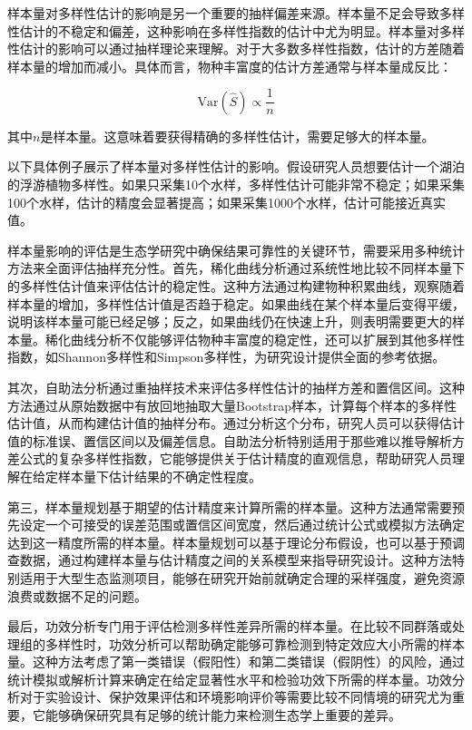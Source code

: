 \documentclass[
  twoside,12pt,fontset=none]{ctexbook}
\begin{document}
样本量对多样性估计的影响是另一个重要的抽样偏差来源。样本量不足会导致多样性估计的不稳定和偏差，这种影响在多样性指数的估计中尤为明显。样本量对多样性估计的影响可以通过抽样理论来理解。对于大多数多样性指数，估计的方差随着样本量的增加而减小。具体而言，物种丰富度的估计方差通常与样本量成反比：

\[\text{Var}(\hat{S}) \propto \frac{1}{n}\]

其中\(n\)是样本量。这意味着要获得精确的多样性估计，需要足够大的样本量。

以下具体例子展示了样本量对多样性估计的影响。假设研究人员想要估计一个湖泊的浮游植物多样性。如果只采集10个水样，多样性估计可能非常不稳定；如果采集100个水样，估计的精度会显著提高；如果采集1000个水样，估计可能接近真实值。

样本量影响的评估是生态学研究中确保结果可靠性的关键环节，需要采用多种统计方法来全面评估抽样充分性。首先，稀化曲线分析通过系统性地比较不同样本量下的多样性估计值来评估估计的稳定性。这种方法通过构建物种积累曲线，观察随着样本量的增加，多样性估计值是否趋于稳定。如果曲线在某个样本量后变得平缓，说明该样本量可能已经足够；反之，如果曲线仍在快速上升，则表明需要更大的样本量。稀化曲线分析不仅能够评估物种丰富度的稳定性，还可以扩展到其他多样性指数，如Shannon多样性和Simpson多样性，为研究设计提供全面的参考依据。

其次，自助法分析通过重抽样技术来评估多样性估计的抽样方差和置信区间。这种方法通过从原始数据中有放回地抽取大量Bootstrap样本，计算每个样本的多样性估计值，从而构建估计值的抽样分布。通过分析这个分布，研究人员可以获得估计值的标准误、置信区间以及偏差信息。自助法分析特别适用于那些难以推导解析方差公式的复杂多样性指数，它能够提供关于估计精度的直观信息，帮助研究人员理解在给定样本量下估计结果的不确定性程度。

第三，样本量规划基于期望的估计精度来计算所需的样本量。这种方法通常需要预先设定一个可接受的误差范围或置信区间宽度，然后通过统计公式或模拟方法确定达到这一精度所需的样本量。样本量规划可以基于理论分布假设，也可以基于预调查数据，通过构建样本量与估计精度之间的关系模型来指导研究设计。这种方法特别适用于大型生态监测项目，能够在研究开始前就确定合理的采样强度，避免资源浪费或数据不足的问题。

最后，功效分析专门用于评估检测多样性差异所需的样本量。在比较不同群落或处理组的多样性时，功效分析可以帮助确定能够可靠检测到特定效应大小所需的样本量。这种方法考虑了第一类错误（假阳性）和第二类错误（假阴性）的风险，通过统计模拟或解析计算来确定在给定显著性水平和检验功效下所需的样本量。功效分析对于实验设计、保护效果评估和环境影响评价等需要比较不同情境的研究尤为重要，它能够确保研究具有足够的统计能力来检测生态学上重要的差异。
\end{document}
